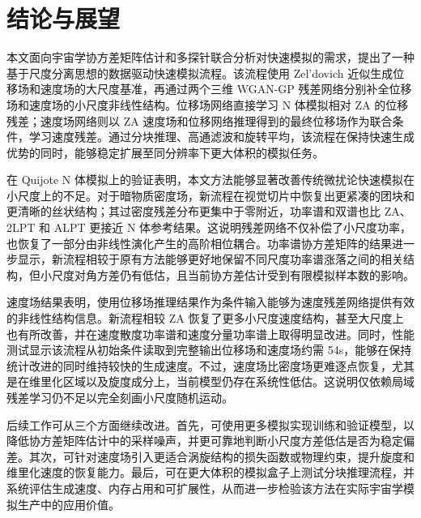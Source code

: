 
\chapter{结论与展望}

本文面向宇宙学协方差矩阵估计和多探针联合分析对快速模拟的需求，提出了一种基于尺度分离思想的数据驱动快速模拟流程。该流程使用 Zel'dovich 近似生成位移场和速度场的大尺度基准，再通过两个三维 WGAN-GP 残差网络分别补全位移场和速度场的小尺度非线性结构。位移场网络直接学习 N 体模拟相对 ZA 的位移残差；速度场网络则以 ZA 速度场和位移网络推理得到的最终位移场作为联合条件，学习速度残差。通过分块推理、高通滤波和旋转平均，该流程在保持快速生成优势的同时，能够稳定扩展至同分辨率下更大体积的模拟任务。

在 Quijote N 体模拟上的验证表明，本文方法能够显著改善传统微扰论快速模拟在小尺度上的不足。对于暗物质密度场，新流程在视觉切片中恢复出更紧凑的团块和更清晰的丝状结构；其过密度残差分布更集中于零附近，功率谱和双谱也比 ZA、2LPT 和 ALPT 更接近 N 体参考结果。这说明残差网络不仅补偿了小尺度功率，也恢复了一部分由非线性演化产生的高阶相位耦合。功率谱协方差矩阵的结果进一步显示，新流程相较于原有方法能够更好地保留不同尺度功率谱涨落之间的相关结构，但小尺度对角方差仍有低估，且当前协方差估计受到有限模拟样本数的影响。

速度场结果表明，使用位移场推理结果作为条件输入能够为速度残差网络提供有效的非线性结构信息。新流程相较 ZA 恢复了更多小尺度速度结构，甚至大尺度上也有所改善，并在速度散度功率谱和速度分量功率谱上取得明显改进。同时，性能测试显示该流程从初始条件读取到完整输出位移场和速度场约需 54s，能够在保持统计改进的同时维持较快的生成速度。不过，速度场比密度场更难逐点恢复，尤其是在维里化区域以及旋度成分上，当前模型仍存在系统性低估。这说明仅依赖局域残差学习仍不足以完全刻画小尺度随机运动。

后续工作可从三个方面继续改进。首先，可使用更多模拟实现训练和验证模型，以降低协方差矩阵估计中的采样噪声，并更可靠地判断小尺度方差低估是否为稳定偏差。其次，可针对速度场引入更适合涡旋结构的损失函数或物理约束，提升旋度和维里化速度的恢复能力。最后，可在更大体积的模拟盒子上测试分块推理流程，并系统评估生成速度、内存占用和可扩展性，从而进一步检验该方法在实际宇宙学模拟生产中的应用价值。
